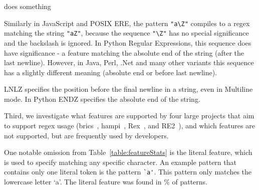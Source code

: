 

\begin{description} \itemsep -1pt
\item [FTR1] does something 
\end{description}

Similarly in JavaScript and POSIX ERE, the pattern \verb!"a\Z"! compiles to a regex matching the string \verb!"aZ"!, because the sequence \verb!"\Z"! has no special significance and the backslash is ignored.  In Python Regular Expressions, this sequence does have significance - a feature matching the absolute end of the string (after the last newline).  However, in Java, Perl, .Net and many other variants this sequence has a slightly different meaning (absolute end or before last newline).

LNLZ specifies the position before the final newline in a string, even in Multiline mode.  In Python ENDZ specifies the absolute end of the string.

Third, we investigate what features are supported by four large projects that aim to support regex usage (brics~\cite{brics}, hampi~\cite{hampi}, Rex~\cite{rex}, and RE2~\cite{re2}), and which features are not supported, but are frequently used by developers.

One notable omission from Table~\ref{table:featureStats} is the literal feature, which is used  to specify matching any specific character.  An example pattern that contains only one literal token is the pattern \verb!`a'!.  This pattern only matches the lowercase letter `a'.  The literal feature was found in \% of patterns.

